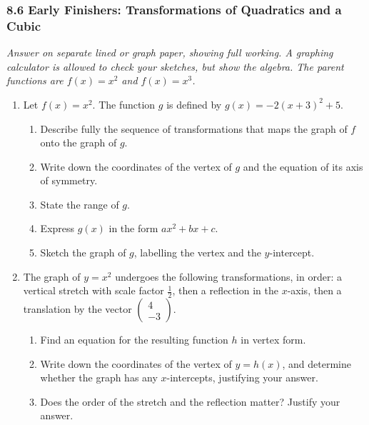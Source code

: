 \documentclass[12pt, twoside]{article}
\begin{document}
\subsubsection*{8.6 Early Finishers: Transformations of Quadratics and a Cubic}

\noindent\emph{Answer on separate lined or graph paper, showing full working.
A graphing calculator is allowed to check your sketches, but show the algebra.
The parent functions are $f(x)=x^2$ and $f(x)=x^3$.}

\medskip

\begin{enumerate}[itemsep=0.55cm]

\item[1.] Let $f(x)=x^2$. The function $g$ is defined by
$\displaystyle g(x)=-2(x+3)^2+5$.

\begin{enumerate}[label=(\alph*), itemsep=0.3cm]
  \item Describe fully the sequence of transformations that maps the graph of
  $f$ onto the graph of $g$.
  \item Write down the coordinates of the vertex of $g$ and the equation of its
  axis of symmetry.
  \item State the range of $g$.
  \item Express $g(x)$ in the form $ax^2+bx+c$.
  \item Sketch the graph of $g$, labelling the vertex and the $y$-intercept.
\end{enumerate}

\item[2.] The graph of $y=x^2$ undergoes the following transformations, in order:
a vertical stretch with scale factor $\tfrac{1}{2}$, then a reflection in the
$x$-axis, then a translation by the vector
$\left(\begin{smallmatrix}4\\-3\end{smallmatrix}\right)$.

\begin{enumerate}[label=(\alph*), itemsep=0.3cm]
  \item Find an equation for the resulting function $h$ in vertex form.
  \item Write down the coordinates of the vertex of $y=h(x)$, and determine
  whether the graph has any $x$-intercepts, justifying your answer.
  \item Does the order of the stretch and the reflection matter? Justify your
  answer.
\end{enumerate}


\end{enumerate}
\end{document}
